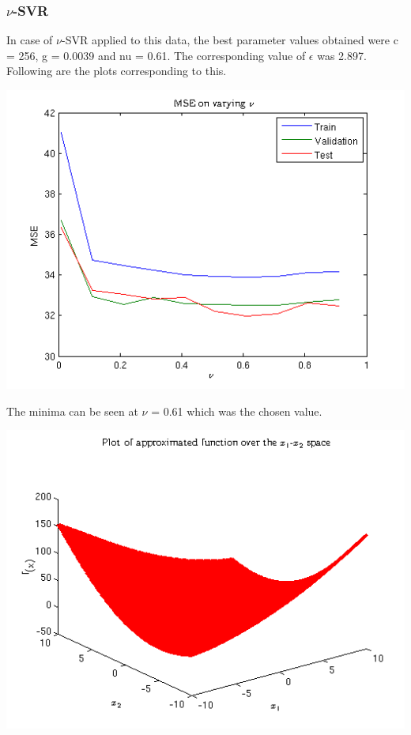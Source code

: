\documentclass{article}
\begin{document}
\subsubsection{$\nu$-SVR}
In case of $\nu$-SVR applied to this data, the best parameter values obtained were c = 256, g = 0.0039 and nu = 0.61. The corresponding value of $\epsilon$ was 2.897. Following are the plots corresponding to this.
\begin{center}
\includegraphics[scale=1]{Regression/bivar/nu/mse}
\end{center}
The minima can be seen at $\nu$ = 0.61 which was the chosen value.
\begin{center}
\includegraphics[scale=1]{Regression/bivar/nu/fun}
\end{center}
\end{document}
